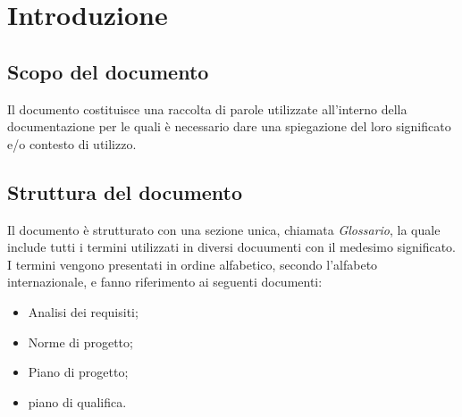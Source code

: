 \section{Introduzione}

\subsection{Scopo del documento}
Il documento costituisce una raccolta di parole utilizzate all'interno della documentazione per le quali è necessario dare una spiegazione del loro significato e/o contesto di utilizzo.

\subsection{Struttura del documento}
Il documento è strutturato con una sezione unica, chiamata \textit{Glossario}, la quale include tutti i termini utilizzati in diversi docuumenti con il medesimo significato. I termini vengono presentati in ordine alfabetico, secondo l'alfabeto internazionale, e fanno riferimento ai seguenti documenti:
\begin{itemize}
		      \item Analisi dei requisiti;
		      \item Norme di progetto;
		      \item Piano di progetto;
		      \item piano di qualifica.
\end{itemize}
